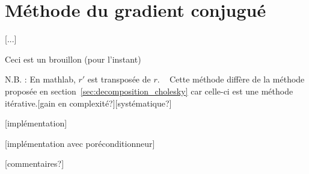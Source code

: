 \documentclass{article}
\begin{document}
\section{Méthode du gradient conjugué}
\label{sec:gradient_conjugue}

[...]
\vskip 1mm ~

Ceci est un brouillon (pour l'instant)

N.B. : En mathlab, $r'$ est transposée de $r$.
\vskip 1mm ~
Cette méthode diffère de la méthode proposée en section~\ref{sec:decomposition_cholesky} car celle-ci est une méthode itérative.[gain en complexité?][systématique?]

[implémentation]

[implémentation avec poréconditionneur]

[commentaires?]
\end{document}
